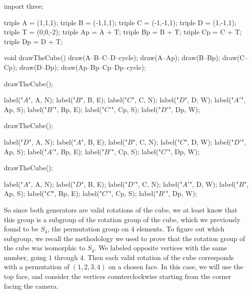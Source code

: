 \documentclass[../key.tex]{subfiles}
\begin{document}
\begin{asydef}
	import three;

	triple A = (1,1,1);
	triple B = (-1,1,1);
	triple C = (-1,-1,1);
	triple D = (1,-1,1);
	triple T = (0,0,-2);
	triple Ap = A + T;
	triple Bp = B + T;
	triple Cp = C + T;
	triple Dp = D + T;

	void drawTheCube() {
		draw(A--B--C--D--cycle);
		draw(A--Ap);
		draw(B--Bp);
		draw(C--Cp);
		draw(D--Dp);
		draw(Ap--Bp--Cp--Dp--cycle);
	}
\end{asydef}

\begin{minipage}{0.3\textwidth}
\begin{asy}[width=0.9\textwidth]
	drawTheCube();

	label("$A$", A, N);
	label("$B$", B, E);
	label("$C$", C, N);
	label("$D$", D, W);
	label("$A'$", Ap, S);
	label("$B'$", Bp, E);
	label("$C'$", Cp, S);
	label("$D'$", Dp, W);
\end{asy}
\end{minipage}\hfill
\begin{minipage}{0.3\textwidth}
\begin{asy}[width=0.9\textwidth]
	drawTheCube();

	label("$D$", A, N);
	label("$A$", B, E);
	label("$B$", C, N);
	label("$C$", D, W);
	label("$D'$", Ap, S);
	label("$A'$", Bp, E);
	label("$B'$", Cp, S);
	label("$C'$", Dp, W);
\end{asy}
\end{minipage}\hfill
\begin{minipage}{0.3\textwidth}
\begin{asy}[width=0.9\textwidth]
	drawTheCube();

	label("$A$", A, N);
	label("$D$", B, E);
	label("$D'$", C, N);
	label("$A'$", D, W);
	label("$B$", Ap, S);
	label("$C$", Bp, E);
	label("$C'$", Cp, S);
	label("$B'$", Dp, W);
\end{asy}
\end{minipage}

So since both generators are valid rotations of the cube, we at least know that this group is a subgroup of the rotation group of the cube, which we previously found to be $S_4$, the permutation group on $4$ elements. To figure out which subgroup, we recall the methodology we used to prove that the rotation group of the cube was isomorphic to $S_4$. We labeled opposite vertices with the same number, going $1$ through $4$. Then each valid rotation of the cube corresponds with a permutation of $(1,2,3,4)$ on a chosen face. In this case, we will use the top face, and consider the vertices counterclockwise starting from the corner facing the camera.
\end{document}
